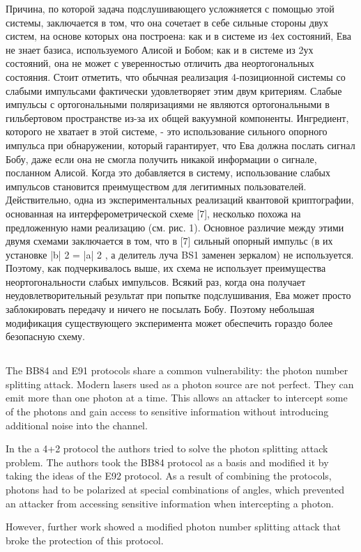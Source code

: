 Причина, по которой задача подслушивающего усложняется с помощью этой системы, заключается в том, что она сочетает в себе сильные стороны двух систем, на основе которых она построена: как и в системе из 4ех состояний, Ева не знает базиса, используемого Алисой и Бобом; как и в системе из 2ух состояний, она не может с уверенностью отличить два неортогональных состояния. Стоит отметить, что обычная реализация 4-позиционной системы со слабыми импульсами фактически удовлетворяет этим двум критериям. Слабые импульсы с ортогональными поляризациями не являются ортогональными в гильбертовом пространстве из-за их общей вакуумной компоненты. Ингредиент, которого не хватает в этой системе, - это использование сильного опорного импульса при обнаружении, который гарантирует, что Ева должна послать сигнал Бобу, даже если она не смогла получить никакой информации о сигнале, посланном Алисой. Когда это добавляется в систему, использование слабых импульсов становится преимуществом для легитимных пользователей. Действительно, одна из экспериментальных реализаций квантовой криптографии, основанная на интерферометрической схеме [7], несколько похожа на предложенную нами реализацию (см. рис. 1). Основное различие между этими двумя схемами заключается в том, что в [7] сильный опорный импульс (в их установке |b| 2 = |a| 2 , а делитель луча BS1 заменен зеркалом) не используется. Поэтому, как подчеркивалось выше, их схема не использует преимущества неортогональности слабых импульсов. Всякий раз, когда она получает неудовлетворительный результат при попытке подслушивания, Ева может просто заблокировать передачу и ничего не посылать Бобу. Поэтому небольшая модификация существующего эксперимента может обеспечить гораздо более безопасную схему.

\subsection{\review}

The BB84 and E91 protocols share a common vulnerability: the photon number splitting attack. Modern lasers used as a photon source are not perfect. They can emit more than one photon at a time. This allows an attacker to intercept some of the photons and gain access to sensitive information without introducing additional noise into the channel.

In the a 4+2 protocol the authors tried to solve the photon splitting attack problem. The authors took the BB84 protocol as a basis and modified it by taking the ideas of the E92 protocol. As a result of combining the protocols, photons had to be polarized at special combinations of angles, which prevented an attacker from accessing sensitive information when intercepting a photon.

However, further work showed a modified photon number splitting attack that broke the protection of this protocol.

\subsection{\dic}


